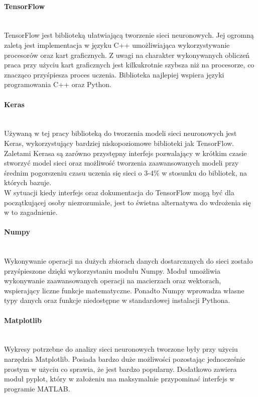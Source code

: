 \paragraph{TensorFlow} \mbox{}\\
TensorFlow jest biblioteką ułatwiającą tworzenie sieci neuronowych. Jej ogromną zaletą
jest implementacja w języku C++ umożliwiająca wykorzystywanie procesorów oraz kart graficznych.
Z uwagi na charakter  wykonywanych obliczeń praca przy użyciu kart graficznych jest
kilkukrotnie szybsza niż na procesorze, co znacząco przyśpiesza proces uczenia.
Biblioteka najlepiej wspiera języki programowania C++ oraz Python.

\paragraph{Keras} \mbox{}\\
Używaną w tej pracy biblioteką do tworzenia modeli sieci neuronowych jest Keras,
wykorzystujący bardziej niskopoziomowe biblioteki jak TensorFlow.
Zaletami Kerasa są zarówno przystępny interfejs pozwalający w krótkim czasie stworzyć model
sieci oraz możliwość tworzenia zaawansowanych modeli przy średnim pogorszeniu czasu
uczenia się sieci o 3-4\% w stosunku do bibliotek, na których bazuje.\\
W sytuacji kiedy interfejs oraz dokumentacja do TensorFlow mogą być dla początkującej
osoby niezrozumiałe, jest to świetna alternatywa do wdrożenia się w to zagadnienie.

\paragraph{Numpy} \mbox{}\\
Wykonywanie operacji na dużych zbiorach danych dostarczanych do sieci zostało przyśpieszone
dzięki wykorzystaniu modułu Numpy. Moduł umożliwia wykonywanie zaawansowanych operacji na macierzach
oraz wektorach, wspierający liczne funkcje matematyczne. Ponadto Numpy wprowadza własne
typy danych oraz funkcje niedostępne w standardowej instalacji Pythona.

\paragraph{Matplotlib} \mbox{}\\
Wykresy potrzebne do analizy sieci neuronowych tworzone były przy użyciu narzędzia Matplotlib.
Posiada bardzo duże możliwości pozostając jednocześnie prostym w użyciu co sprawia, że
jest bardzo popularny. Dodatkowo zawiera moduł pyplot, który w założeniu ma maksymalnie przypominać
interfejs w programie MATLAB.

